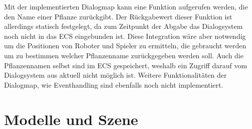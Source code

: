 Mit der implementierten Dialogmap kann eine Funktion aufgerufen werden, die den Name einer Pflanze zurückgibt. Der Rückgabewert dieser Funktion ist allerdings statisch festgelegt, da zum Zeitpunkt der Abgabe das Dialogsystem noch nicht in das ECS eingebunden ist. Diese Integration wäre aber notwendig um die Positionen von Roboter und Spieler zu ermitteln, die gebraucht werden um zu bestimmen welcher Pflanzenname zurückgegeben werden soll. Auch die Pflanzennamen selbst sind im ECS gespeichert, weshalb ein Zugriff darauf vom Dialogsystem aus aktuell nicht möglich ist.  
Weitere Funktionalitäten der Dialogmap, wie Eventhandling sind ebenfalls noch nicht implementiert.

\section{Modelle und Szene}

